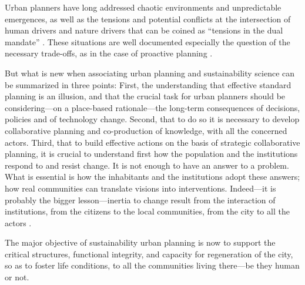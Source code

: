 \documentclass[10pt,a4paper]{article}
\begin{document}
\begin{multicols}{2}
Urban planners have long addressed chaotic environments and unpredictable emergences, as well as the tensions and potential conflicts at the intersection of human drivers and nature drivers that can be coined as ``tensions in the dual mandate'' \citep{r141}. These situations are well documented especially the question of the necessary trade-offs, as in the case of proactive planning \citep{r142}.

But what is new when associating urban planning and sustainability science can be summarized in three points: First, the understanding that effective standard planning is an illusion, and that the crucial task for urban planners should be considering---on a place-based rationale---the long-term consequences of decisions, policies and of technology change. Second, that to do so it is necessary to develop collaborative planning and co-production of knowledge, with all the concerned actors. Third, that to build effective actions on the basis of strategic collaborative planning, it is crucial to understand first how the population and the institutions respond to and resist change. It is not enough to have an answer to a problem. What is essential is how the inhabitants and the institutions adopt these answers; how real communities can translate visions into interventions. Indeed---it is probably the bigger lesson---inertia to change result from the interaction of institutions, from the citizens to the local communities, from the city to all the actors \citep{r143}.

The major objective of sustainability urban planning is now to support the critical structures, functional integrity, and capacity for regeneration of the city, so as to foster life conditions, to all the communities living there---be they human or not. 



\end{multicols}

\vspace{\baselineskip}
\end{document}
